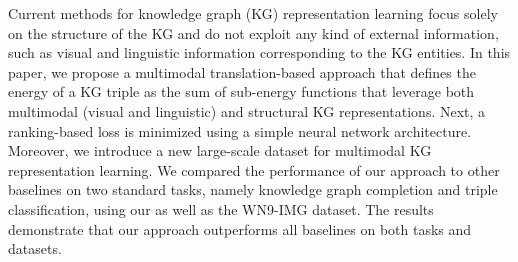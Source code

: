 Current methods for knowledge graph (KG) representation learning focus solely on the structure of the KG and do not exploit any kind of external information, such as visual and linguistic information corresponding to the KG entities. In this paper, we propose a multimodal translation-based approach that defines the energy of a KG triple as the sum of sub-energy functions that leverage both multimodal (visual and linguistic) and structural KG representations. Next, a ranking-based loss is minimized using a simple neural network architecture. Moreover, we introduce a new large-scale dataset for multimodal KG representation learning. We compared the performance of our approach to other baselines on two standard tasks, namely knowledge graph completion and triple classification, using our as well as the WN9-IMG dataset. The results demonstrate that our approach outperforms all baselines on both tasks and datasets.
